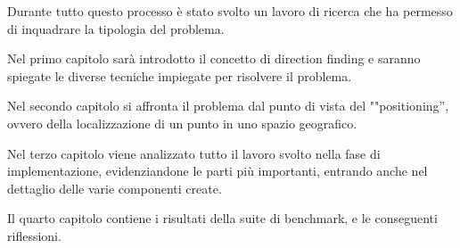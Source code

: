 Durante tutto questo processo è stato svolto un lavoro di ricerca che ha permesso di inquadrare la tipologia del problema.

Nel primo capitolo sarà introdotto il concetto di direction finding e saranno spiegate le diverse tecniche impiegate per risolvere il problema. 

Nel secondo capitolo si affronta il problema dal punto di vista del ""positioning'', ovvero della localizzazione di un punto in uno spazio geografico. 

Nel terzo capitolo viene analizzato tutto il lavoro svolto nella fase di implementazione, evidenziandone le parti più importanti, entrando anche nel dettaglio delle varie componenti create.

Il quarto capitolo contiene i risultati della suite di benchmark, e le conseguenti riflessioni.